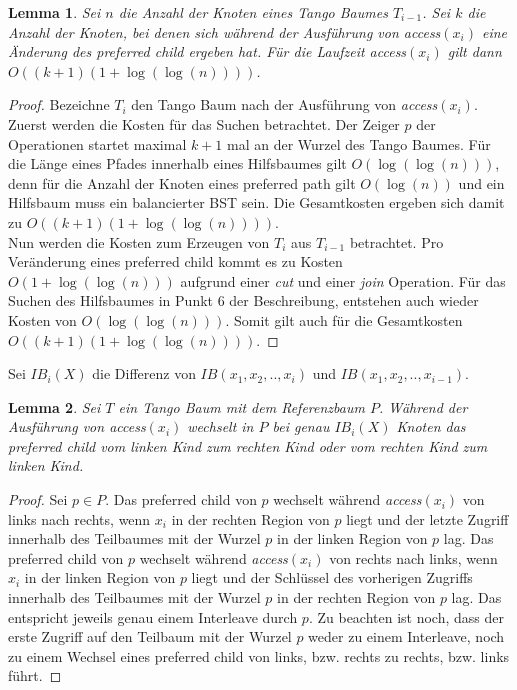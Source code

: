 \documentclass[a4paper,12pt]{article}
\newtheorem{Lemma}{Lemma}[section]
\begin{document}
 
\begin{Lemma} \label{demaineLemma4}
	Sei $n$ die Anzahl der Knoten eines Tango Baumes $T_{i-1}$. Sei $k$ die Anzahl der Knoten, bei denen sich während der Ausführung von \textit{access}$\left(x_i\right)$ eine Änderung des preferred child ergeben hat. Für die Laufzeit \textit{access}$\left(x_i\right)$ gilt dann $O\left(\left(k + 1\right) \left(1 + \log \left( \log  \left(n \right)\right)\right)\right)$.
\end{Lemma}
\begin{proof}
	Bezeichne $T_i$ den Tango Baum nach der Ausführung von \textit{access}$\left(x_i\right)$. Zuerst werden die Kosten für das Suchen betrachtet. Der Zeiger $p$ der Operationen startet maximal $k + 1$ mal an der Wurzel des Tango Baumes. Für die Länge eines Pfades innerhalb eines Hilfsbaumes gilt $O\left(\log \left( \log  \left(n \right)\right)\right)$, denn für die Anzahl der Knoten eines preferred path gilt $O\left( \log \left(n\right)  \right)$ und ein Hilfsbaum muss ein balancierter BST sein. Die Gesamtkosten ergeben sich damit zu $O\left(\left(k + 1\right) \left(1 + \log \left( \log  \left(n \right)\right)\right)\right)$.\\
	Nun werden die Kosten zum Erzeugen von $T_i$ aus $T_{i-1}$ betrachtet. Pro Veränderung eines preferred child kommt es zu Kosten $O\left(1 + \log\left(\log \left(n\right)\right)\right)$ aufgrund einer \textit{cut} und einer \textit{join} Operation. Für das Suchen des Hilfsbaumes in Punkt $6$ der Beschreibung, entstehen auch wieder Kosten von $O\left(\log \left( \log  \left(n \right)\right)\right)$. Somit gilt auch für die Gesamtkosten $O\left(\left(k + 1\right) \left(1 + \log \left( \log  \left(n \right)\right)\right)\right)$.
	
	
\end{proof}
\noindent Sei $\mathit{IB}_i\left(X\right)$ die Differenz von $\mathit{IB}\left(x_1, x_2,..,x_i\right)$ und  $\mathit{IB}\left(x_1, x_2,..,x_{i-1}\right)$. 

\begin{Lemma} \label{demaineLemma5}
	Sei $T$ ein Tango Baum mit dem Referenzbaum $P$. 
	Während der Ausführung von \textit{access}$\left(x_i\right)$ wechselt in $P$ bei genau $\mathit{IB}_i\left(X\right)$ Knoten das preferred child vom linken Kind zum rechten Kind oder vom rechten Kind zum linken Kind.
\end{Lemma}
\begin{proof}
	Sei $p \in P$. Das preferred child von $p$ wechselt während  \textit{access}$\left(x_i\right)$ von links nach rechts,  wenn $x_i$ in der rechten Region von $p$ liegt und der letzte Zugriff innerhalb des Teilbaumes mit der Wurzel $p$ in der linken Region von $p$ lag.  Das preferred child von $p$ wechselt während  \textit{access}$\left(x_i\right)$ von rechts nach links,  wenn $x_i$ in der linken Region von $p$ liegt und der Schlüssel des vorherigen Zugriffs innerhalb des Teilbaumes mit der Wurzel $p$ in der rechten Region von $p$ lag. Das entspricht jeweils genau einem Interleave durch $p$. Zu beachten ist noch, dass der erste Zugriff auf den Teilbaum mit der Wurzel $p$ weder zu einem Interleave, noch zu einem Wechsel eines preferred child von links, bzw. rechts zu rechts, bzw. links führt. 	
\end{proof}
\end{document}

